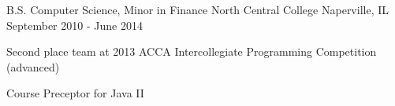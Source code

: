 

\begin{cventries}

  \cventry
    {B.S. Computer Science, Minor in Finance} %
    {North Central College} %
    {Naperville, IL} %
    {September 2010 - June 2014} %
    {
      \begin{cvitems} %
        \item{Second place team at 2013 ACCA Intercollegiate Programming Competition (advanced)}
        \item{Course Preceptor for Java II}
      \end{cvitems}
    }

\end{cventries}
